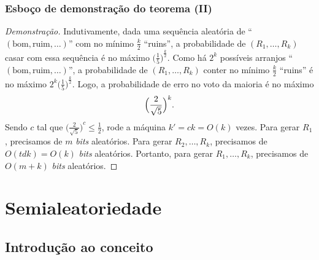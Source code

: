 \documentclass{beamer}
\def\MMp{\mathrm{.}} %
\def\leq{\leqslant} %
\theoremstyle{teoaxicorlem}
\theoremstyle{defnotnom}
\newenvironment{dem}%
	{\begin{proof}[Demonstração]}%
	{\end{proof}}
\begin{document}
\begin{frame}
  \frametitle{Esboço de demonstração do teorema (II)}
  \begin{dem}
    \small
    Indutivamente, dada uma sequência aleatória de
    ``$(\text{bom},\text{ruim},\dotsc)$'' com no mínimo $\frac{k}2$
    ``ruins'', a probabilidade de $(R_1,\dotsc,R_k)$ casar com essa
    sequência é no máximo ${\bigl(\frac15\bigr)}^{\frac{k}2}$.\pause
    Como há $2^k$ possíveis arranjos
    ``$(\text{bom},\text{ruim},\dotsc)$'',
    a probabilidade de $(R_1,\dotsc,R_k)$ conter no mínimo $\frac{k}2$
    ``ruins'' é no máximo $2^k{\bigl(\frac15\bigr)}^{\frac{k}2}$.\pause
    Logo, a probabilidade de erro no voto da maioria é no máximo
    \begin{equation*}
      \Bigl(\frac2{\sqrt 5}\Bigr)^k\MMp
    \end{equation*}
    \pause Sendo $c$ tal que ${\bigl(\frac{2}{\sqrt 5}\bigr)}^c\leq
    \frac12$, rode a máquina $k'=ck=O(k)$ vezes.
    \pause Para gerar $R_1$, precisamos de $m$ \textit{bits}
    aleatórios. \pause
    Para gerar $R_2,\dotsc,R_k$, precisamos de $O(tdk) = O(k)$
    \textit{bits} aleatórios. \pause
    Portanto, para gerar $R_1,\dotsc,R_k$, precisamos de $O(m+k)$
    \textit{bits} aleatórios.
  \end{dem}
\end{frame}

\section{Semialeatoriedade}

\subsection{Introdução ao conceito}
\end{document}
